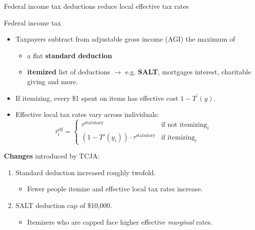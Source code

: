 \documentclass[10pt, aspectratio=169]{beamer}
\begin{document}
\begin{frame}{Federal income tax deductions reduce local effective tax rates}
    
    \begin{block}{\alert{Federal income tax}}
        \begin{itemize}
            \item Taxpayers subtract from adjustable gross income (AGI) the maximum of 
            \vspace{-.1cm}
            \begin{itemize}
                \item [a)] a flat \textbf{standard deduction} 
                \item[b)] \textbf{itemized} list of deductions $\rightarrow$ e.g. \textbf{SALT}, mortgages interest, charitable giving and more.
            \end{itemize}  
            \vspace{-.1cm}
            \item {If} itemizing, every \$1 spent on items has effective cost $1 - T^\prime(y)$.
            \vspace{-.1cm}
            \item Effective local tax rates vary across individuals:
            \vspace{-.1cm}
            $$\tau^{\text{eff}}_i = \begin{cases} \tau^{\text{statutory}} & \text{if not itemizing}_i \\ (1 - T'(y_i)) \cdot \tau^{\text{statutory}} & \text{if itemizing}_i \end{cases}$$
        \end{itemize}   
    \end{block}

    {\textbf{Changes} introduced by TCJA:}
    {\small
    \vspace{-.2cm}
    \begin{enumerate}
        \item {Standard deduction} increased roughly twofold.
        \begin{itemize}
            \item[$\rightarrow$] Fewer people itemize and effective local tax rates increase.
        \end{itemize}
        \item {SALT} deduction cap of \$10,000.
        \begin{itemize}
            \item[$\rightarrow$] Itemizers who are capped face higher effective \textit{marginal} rates.
        \end{itemize}
    \end{enumerate}
    }

\end{frame}
\end{document}
